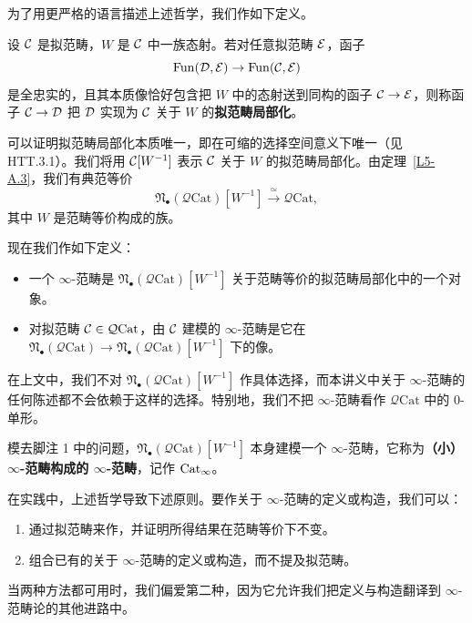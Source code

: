\nitem\label{L5-9.2} 为了用更严格的语言描述上述哲学，我们作如下定义。

\begin{definition}\label{L5-9.3}
设 $\mathcal{C}$ 是拟范畴，$W$ 是 $\mathcal{C}$ 中一族态射。若对任意拟范畴 $\mathcal{E}$，函子
\[
\operatorname{Fun}(\mathcal{D},\mathcal{E})\to\operatorname{Fun}(\mathcal{C},\mathcal{E})
\]
是全忠实的，且其本质像恰好包含把 $W$ 中的态射送到同构的函子 $\mathcal{C}\to\mathcal{E}$，则称函子 $\mathcal{C}\to\mathcal{D}$ 把 $\mathcal{D}$ 实现为 $\mathcal{C}$ 关于 $W$ 的\textbf{拟范畴局部化}。
\end{definition}

\nitem\label{L5-9.4} 可以证明拟范畴局部化本质唯一，即在可缩的选择空间意义下唯一（见 HTT.3.1）。我们将用 $\mathcal{C}[W^{-1}]$ 表示 $\mathcal{C}$ 关于 $W$ 的拟范畴局部化。由定理~\ref{L5-A.3}，我们有典范等价
\[
\mathfrak{N}_{\bullet}(\mathcal{Q}\mathrm{Cat})[W^{-1}]\xrightarrow{\ \simeq\ }\mathcal{Q}\mathrm{Cat},
\]
其中 $W$ 是范畴等价构成的族。

\nitem\label{L5-9.5} 现在我们作如下定义：
\begin{itemize}[leftmargin=2.2em,itemsep=0.1em]
\item 一个 $\infty$-范畴是 $\mathfrak{N}_{\bullet}(\mathcal{Q}\mathrm{Cat})[W^{-1}]$ 关于范畴等价的拟范畴局部化中的一个对象。
\item 对拟范畴 $\mathcal{C}\in\mathcal{Q}\mathrm{Cat}$，由 $\mathcal{C}$ 建模的 $\infty$-范畴是它在 $\mathfrak{N}_{\bullet}(\mathcal{Q}\mathrm{Cat})\to\mathfrak{N}_{\bullet}(\mathcal{Q}\mathrm{Cat})[W^{-1}]$ 下的像。
\end{itemize}
在上文中，我们不对 $\mathfrak{N}_{\bullet}(\mathcal{Q}\mathrm{Cat})[W^{-1}]$ 作具体选择，而本讲义中关于 $\infty$-范畴的任何陈述都不会依赖于这样的选择。特别地，我们不把 $\infty$-范畴看作 $\mathcal{Q}\mathrm{Cat}$ 中的 $0$-单形。

模去脚注 1 中的问题，$\mathfrak{N}_{\bullet}(\mathcal{Q}\mathrm{Cat})[W^{-1}]$ 本身建模一个 $\infty$-范畴，它称为\textbf{（小）$\infty$-范畴构成的 $\infty$-范畴}，记作 $\operatorname{Cat}_\infty$。

\nitem\label{L5-9.6} 在实践中，上述哲学导致下述原则。要作关于 $\infty$-范畴的定义或构造，我们可以：
\begin{enumerate}[label=(\roman*),leftmargin=2.4em,itemsep=0.1em]
\item 通过拟范畴来作，并证明所得结果在范畴等价下不变。
\item 组合已有的关于 $\infty$-范畴的定义或构造，而不提及拟范畴。
\end{enumerate}
当两种方法都可用时，我们偏爱第二种，因为它允许我们把定义与构造翻译到 $\infty$-范畴论的其他进路中。


